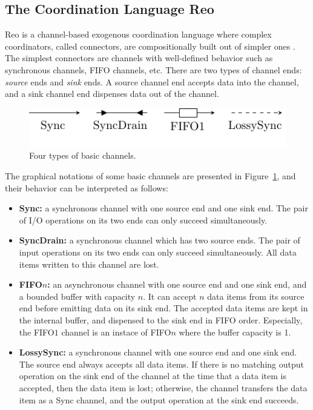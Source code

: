 \documentclass[preprint,3p]{elsarticle}
\newcommand{\xy}[1]{{#1}}
\begin{document}
\subsection{The Coordination Language Reo}
Reo is a channel-based exogenous coordination language \xy{where complex coordinators, called connectors,}
are compositionally built out of simpler ones \cite{Arb04}.
The simplest connectors are channels with well-defined behavior such as synchronous channels, FIFO channels, etc.
There are two types of channel ends: \emph{source} ends and \emph{sink} ends. A source channel end accepts
data into the channel, and a sink channel end dispenses data out of the channel.
\begin{figure}
  \centering
  \includegraphics[width=.5\textwidth]{basics.pdf}
  \caption{Four types of basic channels.}\label{fig:basicchannel}
\end{figure}

The graphical notations of some basic channels are presented in Figure~\ref{fig:basicchannel}, and their behavior can be interpreted as follows:
\begin{itemize}
\item{\textbf{Sync:} a synchronous channel with one source end and one sink end. The pair of I/O operations on its two ends \xy{can only succeed simultaneously.}}
\item{\textbf{SyncDrain:} a synchronous channel which has two source ends.
 The pair of input operations on its two ends \xy{can only succeed} simultaneously.
 All data items written to this channel are lost.}
\item{\textbf{FIFO$n$:} an asynchronous channel with one source end and one sink end, and a bounded buffer with capacity $n$.
It can \xy{accept $n$ data items from its source end before emitting data on its sink end.} The accepted data items are kept in the internal buffer, and dispensed to
the sink end in FIFO order.
Especially, the FIFO$1$ channel is an instace of FIFO$n$ where the buffer capacity is 1.}
\item{\textbf{LossySync:} a synchronous channel with one source end
    and one sink end. The source end always accepts all data items. If
    there is no matching output operation on the sink end of the
    channel at the time that a data item is accepted, then the data
    item is lost; otherwise, the channel transfers the data item
    as a Sync channel, and the output operation at the sink end succeeds.}
\end{itemize}
\end{document}
